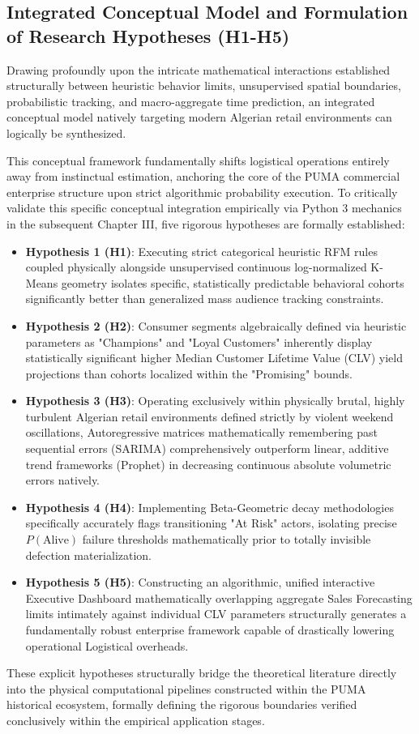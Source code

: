 \documentclass[12pt,a4paper]{report}
\begin{document}
\subsection{Integrated Conceptual Model and Formulation of Research Hypotheses (H1-H5)}
Drawing profoundly upon the intricate mathematical interactions established structurally between heuristic behavior limits, unsupervised spatial boundaries, probabilistic tracking, and macro-aggregate time prediction, an integrated conceptual model natively targeting modern Algerian retail environments can logically be synthesized.

This conceptual framework fundamentally shifts logistical operations entirely away from instinctual estimation, anchoring the core of the PUMA commercial enterprise structure upon strict algorithmic probability execution. To critically validate this specific conceptual integration empirically via Python 3 mechanics in the subsequent Chapter III, five rigorous hypotheses are formally established:

\begin{itemize}
    \item \textbf{Hypothesis 1 (H1)}: Executing strict categorical heuristic RFM rules coupled physically alongside unsupervised continuous log-normalized K-Means geometry isolates specific, statistically predictable behavioral cohorts significantly better than generalized mass audience tracking constraints.
    \item \textbf{Hypothesis 2 (H2)}: Consumer segments algebraically defined via heuristic parameters as "Champions" and "Loyal Customers" inherently display statistically significant higher Median Customer Lifetime Value (CLV) yield projections than cohorts localized within the "Promising" bounds.
    \item \textbf{Hypothesis 3 (H3)}: Operating exclusively within physically brutal, highly turbulent Algerian retail environments defined strictly by violent weekend oscillations, Autoregressive matrices mathematically remembering past sequential errors (SARIMA) comprehensively outperform linear, additive trend frameworks (Prophet) in decreasing continuous absolute volumetric errors natively.
    \item \textbf{Hypothesis 4 (H4)}: Implementing Beta-Geometric decay methodologies specifically accurately flags transitioning "At Risk" actors, isolating precise $P(\text{Alive})$ failure thresholds mathematically prior to totally invisible defection materialization.
    \item \textbf{Hypothesis 5 (H5)}: Constructing an algorithmic, unified interactive Executive Dashboard mathematically overlapping aggregate Sales Forecasting limits intimately against individual CLV parameters structurally generates a fundamentally robust enterprise framework capable of drastically lowering operational Logistical overheads.
\end{itemize}

These explicit hypotheses structurally bridge the theoretical literature directly into the physical computational pipelines constructed within the PUMA historical ecosystem, formally defining the rigorous boundaries verified conclusively within the empirical application stages.
\end{document}
